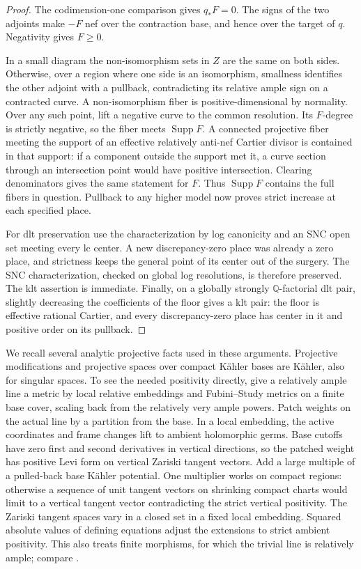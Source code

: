 \documentclass[11pt,letterpaper]{article}
\theoremstyle{definition}
\theoremstyle{remark}
\begin{document}
\begin{proof}
The codimension-one comparison gives $q_*F=0$.  The signs of the two
adjoints make $-F$ nef over the contraction base, and hence over the
target of $q$.  Negativity gives $F\geq0$.

In a small diagram the non-isomorphism sets in $Z$ are the same on
both sides.  Otherwise, over a region where one side is an isomorphism,
smallness identifies the other adjoint with a pullback, contradicting
its relative ample sign on a contracted curve.  A non-isomorphism
fiber is positive-dimensional by normality.  Over any such point,
lift a negative curve to the common resolution.  Its $F$-degree is
strictly negative, so the fiber meets $\operatorname{Supp} F$.  A connected
projective fiber meeting the support of an effective relatively
anti-nef Cartier divisor is contained in that support: if a component
outside the support met it, a curve section through an intersection
point would have positive intersection.  Clearing denominators gives
the same statement for $F$.  Thus $\operatorname{Supp} F$ contains the full fibers
in question.  Pullback to any higher model now proves strict increase
at each specified place.

For dlt preservation use the characterization by log canonicity and an
SNC open set meeting every lc center.  A new discrepancy-zero place
was already a zero place, and strictness keeps the general point of
its center out of the surgery.  The SNC characterization, checked on
global log resolutions, is therefore preserved.  The klt assertion is
immediate.  Finally, on a globally strongly $\mathbb{Q}$-factorial dlt pair,
slightly decreasing the coefficients of the floor gives a klt pair:
the floor is effective rational Cartier, and every discrepancy-zero
place has center in it and positive order on its pullback.
\end{proof}

We recall several analytic projective facts used in these arguments.
Projective modifications and projective spaces over compact K\"ahler
bases are K\"ahler, also for singular spaces.  To see the needed
positivity directly, give a relatively ample line a metric by local
relative embeddings and Fubini--Study metrics on a finite base cover,
scaling back from the relatively very ample powers.  Patch weights on
the actual line by a partition from the base.  In a local embedding,
the active coordinates and frame changes lift to ambient holomorphic
germs.  Base cutoffs have zero first and second derivatives in
vertical directions, so the patched weight has positive Levi form on
vertical Zariski tangent vectors.  Add a large multiple of a pulled-back
base K\"ahler potential.  One multiplier works on compact regions:
otherwise a sequence of unit tangent vectors on shrinking compact
charts would limit to a vertical tangent vector contradicting the
strict vertical positivity.  The Zariski tangent spaces vary in a
closed set in a fixed local embedding.  Squared absolute values of
defining equations adjust the extensions to strict ambient
positivity.  This also treats finite morphisms, for which the trivial
line is relatively ample; compare \cite{VarouchasKahler}.
\end{document}
